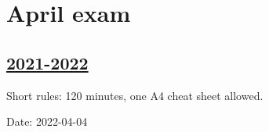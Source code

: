 
\newpage
\thispagestyle{empty}
\section{April exam}
 


\subsection[2021-2022]{\hyperref[sec:sol_kr_03_2021_2022]{2021-2022}}
\label{sec:kr_03_2021_2022} %

Short rules: 120 minutes, one A4 cheat sheet allowed. 

Date: 2022-04-04



